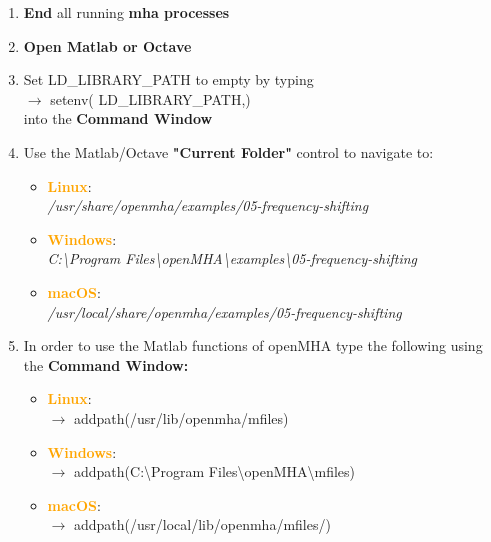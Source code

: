 \documentclass[11pt,a4paper,twoside]{article}
\newcommand{\+}{\discretionary{\mbox{\scriptsize$\hookleftarrow$}}{}{}}
\begin{document}
\begin{enumerate}
\item \textbf{End} all running \textbf{mha processes} 
\item \textbf{Open Matlab or Octave} 
\item Set LD\_LIBRARY\_PATH to empty by typing \\ {\ttfamily
  $\rightarrow$ setenv(\textquotesingle
  LD\_LIBRARY\_PATH\textquotesingle,\textquotesingle\textquotesingle)} \\
  into the \textbf{Command Window}
\item Use the Matlab/Octave \textbf{"Current Folder"} control to navigate to:

\begin{itemize}
\item \textcolor{orange}{\textbf{Linux}}: \\
  \textit{/usr/share/openmha/examples/05-frequency-shifting}
\item \textcolor{orange}{\textbf{Windows}}: \\
  \textit{C:\textbackslash Program Files\textbackslash openMHA\textbackslash examples\textbackslash 05-frequency-shifting}
\item \textcolor{orange}{\textbf{macOS}}: \\
  \textit{/usr/local/share/openmha/examples/05-frequency-shifting}
\end{itemize}

\item In order to use the Matlab functions of openMHA type the following using the \textbf{Command Window:} 

\begin{itemize}
\item \textcolor{orange}{\textbf{Linux}}: \\ $\rightarrow$
  {\ttfamily addpath(\textquotesingle{}/usr/lib/openmha/mfiles\textquotesingle{})}
\item \textcolor{orange}{\textbf{Windows}}: \\ $\rightarrow$
  {\ttfamily addpath(\textquotesingle{}C:\textbackslash Program Files\textbackslash openMHA\textbackslash mfiles\textquotesingle{})}
\item \textcolor{orange}{\textbf{macOS}}: \\ $\rightarrow$
  {\ttfamily addpath(\textquotesingle{}/usr/local/lib/openmha/mfiles/\textquotesingle{})}
\end{itemize}



\end{enumerate}
\end{document}
